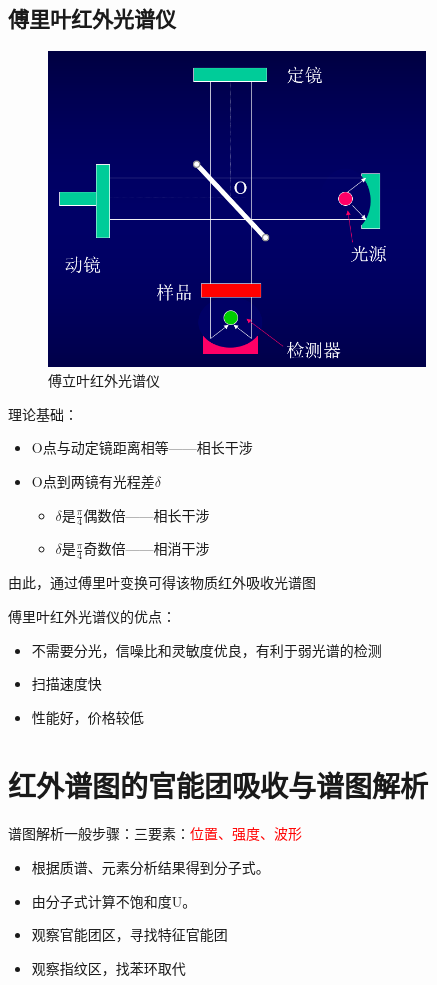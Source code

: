 \subsection{傅里叶红外光谱仪}
\begin{figure}[ht]
	\centering
	\includegraphics[width=10cm]{image/chp5_fur_ins.png}
	\caption{傅立叶红外光谱仪}
	\label{fig:fur_ins}
\end{figure}
理论基础：
\begin{itemize}
	\item O点与动定镜距离相等——相长干涉
	\item O点到两镜有光程差$\delta$
	\begin{itemize}
		\item $\delta$是$\frac{\pi}{4}$偶数倍——相长干涉
		\item $\delta$是$\frac{\pi}{4}$奇数倍——相消干涉
	\end{itemize}
\end{itemize}

由此，通过傅里叶变换可得该物质红外吸收光谱图
\begin{note}
	傅里叶红外光谱仪的优点：
	\begin{itemize}
		\item 不需要分光，信噪比和灵敏度优良，有利于弱光谱的检测
		\item 扫描速度快
		\item 性能好，价格较低
	\end{itemize}
\end{note}

\section{红外谱图的官能团吸收与谱图解析}
\begin{note}
	谱图解析一般步骤：三要素：\textcolor{red}{位置、强度、波形}
	\begin{itemize}
		\item 根据质谱、元素分析结果得到分子式。
		\item 由分子式计算不饱和度U。
		\item 观察官能团区，寻找特征官能团
		\item 观察指纹区，找苯环取代
	\end{itemize}
\end{note}

